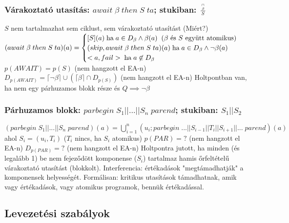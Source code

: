 \documentclass[12pt,a4paper]{article}
\begin{document}
\subsubsection{Várakoztató utasítás: $await \; \beta \; then \; S \; ta$; stukiban: $\frac{{\cap \atop \beta}}{S}$}

\begin{outline}
	\1 $S$ nem tartalmazhat sem ciklust, sem várakoztató utasítást (Miért?)
	\1 $(await \; \beta \; then \; S \; ta)(a) = \begin{cases}
		[S](a) \text{\;ha\;} a \in D_\beta \wedge \beta(a) \;\; \text{($\beta$ és $S$ együtt atomikus)}\\
		(skip,await \; \beta \; then \; S \; ta)(a) \text{\;ha\;} a \in D_\beta \wedge \lnot \beta(a)\\
		<a,fail> \text{\;ha\;} a \not \in D_\beta
		\end{cases}$
	\1 $p(AWAIT)=p(S)$ \;\; (nem hangzott el EA-n)
	\1 $D_{p(AWAIT)}=\lceil \lnot \beta \rceil \cup (\lceil \beta \rceil \cap D_{p(S)})$ \;\; (nem hangzott el EA-n)
	\1 Holtpontban van, ha nem egy párhuzamos blokk része és $Q \implies \lnot \beta$
\end{outline}

\subsubsection{Párhuzamos blokk: $parbegin \; S_1||...||S_n \; parend$; stukiban: $S_1 || S_2$}

\begin{outline}
	\1 $(parbegin \; S_1||...||S_n \; parend)(a)=\bigcup_{i=1}^n (u_i;parbegin \; ...||S_{i-1}||T_i||S_{i+1}||... \; parend)(a)$
		\2 ahol $S_i=(u_i,T_i)$ \;\; ($T_i$ nincs, ha $S_i$ atomikus)
	\1 $p(PAR) = ?$ \;\; (nem hangzott el EA-n)
	\1 $D_{p(PAR)} = ?$ \;\; (nem hangzott el EA-n)
	\1 Holtpontra jutott, ha minden (és legalább 1) be nem fejeződött komponense ($S_i$) tartalmaz hamis őrfeltételű várakoztató utasítást (blokkolt).
	\1 Interferencia: értékadások "megtámadhatják" a komponensek helyességét.
		\2 Formálisan: kritikus utasítások támadhatnak, amik vagy értékadások, vagy atomikus programok, bennük értékadással.
\end{outline}

\pagebreak

\subsection{Levezetési szabályok}
\end{document}
